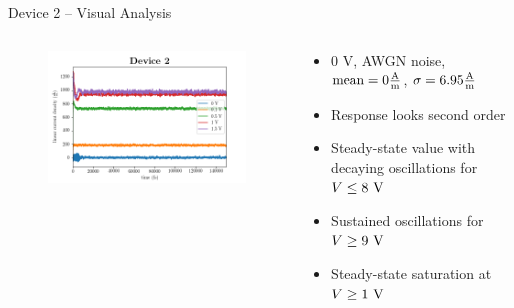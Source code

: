 \documentclass{beamer}
\begin{document}
\begin{frame}{Device 2 -- Visual Analysis}

\begin{columns}
\begin{column}{0.5\textwidth}
\begin{figure}
    \centering
    \includegraphics[scale=0.35]{Figures/Device_2/0_to_1_5.png}
    \label{fig:dev_2_1}
\end{figure}{}
\end{column}

\begin{column}{0.5\textwidth}
\begin{itemize}
    \item 0 V, AWGN noise, $\textnormal{mean} = 0 \frac{\textnormal{A}}{\textnormal{m}}$, $\sigma = 6.95 \frac{\textnormal{A}}{\textnormal{m}}$
    \item Response looks second order
    \item Steady-state value with decaying oscillations for $V \leq 8 \textnormal{ V}$
    \item Sustained oscillations for $V \geq 9 \textnormal{ V}$
    \item Steady-state saturation at $V \geq 1 \textnormal{ V}$
\end{itemize}
\end{column}
\end{columns}

\end{frame}
\end{document}

